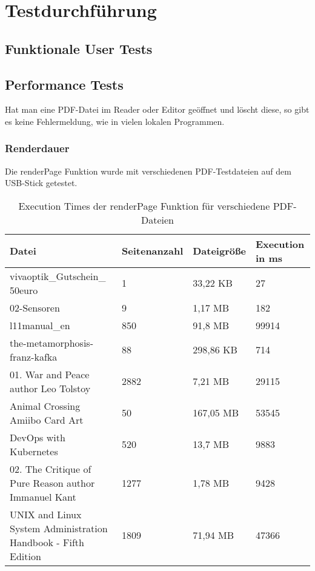 \section{Testdurchführung}

\subsection{Funktionale User Tests}

\subsection{Performance Tests}
Hat man eine PDF-Datei im Reader oder Editor geöffnet und löscht diese, so gibt es keine Fehlermeldung, wie in vielen lokalen Programmen.
\subsubsection{Renderdauer}
Die renderPage Funktion wurde mit verschiedenen PDF-Testdateien auf dem USB-Stick getestet.

\begin{table}[!htbp]
	\centering
	\begin{tabular}{|p{4cm}|p{3cm}|p{3cm}|p{3cm}|}
		\hline
		\textbf{Datei}													& \textbf{Seitenanzahl} 	& \textbf{Dateigröße} 	& \textbf{Execution in ms}	\\ 
		\hline
		\parbox[t]{4cm}{vivaoptik\_Gutschein\_\\50euro}					& 1 						& 33,22 KB  			& 27						\\ 
		02-Sensoren														& 9 						& 1,17 MB  				& 182						\\ 
		l11manual\_en 													& 850 						& 91,8 MB  				& 99914						\\
		the-metamorphosis-franz-kafka 									& 88 						& 298,86 KB  			& 714						\\ 
		01. War and Peace author Leo Tolstoy 							& 2882 						& 7,21 MB  				& 29115						\\ 
		Animal Crossing Amiibo Card Art									& 50 						& 167,05 MB  			& 53545						\\  
		DevOps with Kubernetes											& 520 						& 13,7 MB  				& 9883						\\  
		02. The Critique of Pure Reason author Immanuel Kant			& 1277 						& 1,78 MB  				& 9428						\\  
		UNIX and Linux System Administration Handbook - Fifth Edition	& 1809						& 71,94 MB  			& 47366						\\ 
		\hline
	\end{tabular}
	\caption{Execution Times der renderPage Funktion für verschiedene PDF-Dateien}
	\label{table:render-dur}
\end{table}

